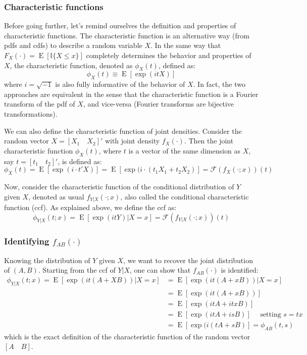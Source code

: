 \documentclass[12pt]{report}
\newcommand{\E}[1]{\operatorname{E}\left[#1\right]}
\begin{document}
\subsubsection{Characteristic functions}

Before going further, let's remind ourselves the definition and properties of characteristic functions. The characteristic function is an alternative way (from pdfs and cdfs) to describe a random variable $X$. In the same way that $F_X(\cdot) = \E{\mathbb{I}\{X\leq x\}}$ completely determines the behavior and properties of $X$, the characteristic function, denoted as $\phi_X(t)$, defined as: $$\phi_X(t)\equiv \E{\exp(itX)}$$ where $i=\sqrt{-1}$ is also fully informative of the behavior of $X$. In fact, the two approaches are equivalent in the sense that the characteristic function is a Fourier transform of the pdf of $X$, and vice-versa (Fourier transforms are bijective transformations).

We can also define the characteristic function of joint densities. Consider the random vector $X = [X_1\quad X_2]'$ with joint density $f_{X}(\cdot)$. Then the joint characteristic function $\phi_{X}(t)$, where $t$ is a vector of the same dimension as $X$, say $t = [t_1\quad t_2]'$, is defined as: $$\phi_{X}(t) = \E{\exp(i\cdot t'X)} = \E{\exp(i\cdot (t_1X_1 + t_2X_2)} = \mathcal{F}\left(f_{X}(\cdot; x)\right)(t)$$

Now, consider the characteristic function of the conditional distribution of $Y$ given $X$, denoted as usual $f_{Y\vert X}(\cdot ; x)$, also called the conditional characteristic function (ccf). As explained above, we define the ccf as: $$\phi_{Y\vert X}(t ; x) = \E{\exp(itY)\vert X=x} =  \mathcal{F}\left(f_{Y\vert X}(\cdot; x)\right)(t) $$

\subsubsection{Identifying $f_{AB}(\cdot)$}

Knowing the distribution of $Y$ given $X$, we want to recover the joint distribution of $(A,B)$. Starting from the ccf of $Y\vert X$, one can show that $f_{AB}(\cdot)$ is identified:
\begin{align*}
\phi_{Y\vert X}(t ; x) = \E{\exp(it(A + XB))\vert X=x} & = \E{\exp(it(A + xB))\vert X=x} \\
& = \E{\exp(it(A + xB))} \\
& = \E{\exp(itA + itxB)} \\
& = \E{\exp(itA + isB)} \quad \text{ setting }s=tx \\
& = \E{\exp(i(tA + sB)} = \phi_{AB}(t, s)
\end{align*}
which is the exact definition of the characteristic function of the random vector $[A\quad B]$.
\end{document}
